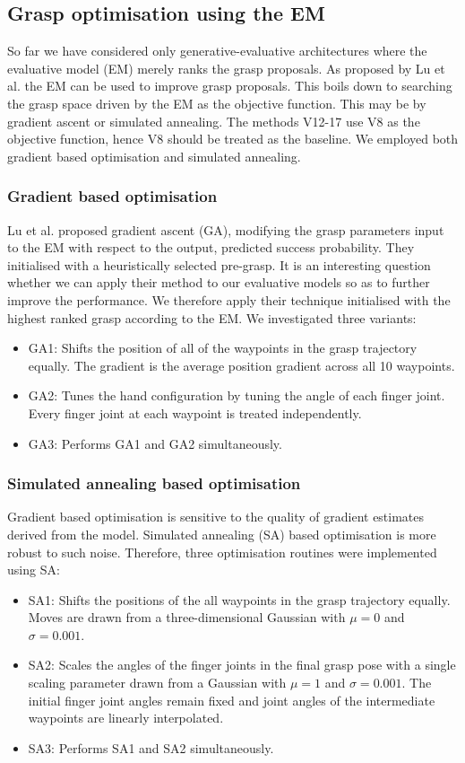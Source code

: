 \subsection{Grasp optimisation using the EM}
\noindent
So far we have considered only generative-evaluative architectures where the evaluative model (EM) merely ranks the grasp proposals. As proposed by Lu et al. \cite{lu2017planning} the EM can be used to improve grasp proposals. This boils down to searching the grasp space driven by the EM as the objective function. This may be by gradient ascent or simulated annealing. The methods V12-17 use V8 as the objective function, hence V8 should be treated as the baseline. We employed both gradient based optimisation and simulated annealing.

\subsubsection{Gradient based optimisation}
\noindent
Lu et al. \cite{lu2017planning} proposed gradient ascent (GA), modifying the grasp parameters input to the EM with respect to the output, predicted success probability. They initialised with a heuristically selected pre-grasp. It is an interesting question whether we can apply their method to our evaluative models so as to further improve the performance. We therefore apply their technique initialised with the highest ranked grasp according to the EM. We investigated three variants:
\begin{itemize}
\item GA1: Shifts the position of all of the waypoints in the grasp trajectory equally. The gradient is the average position gradient across all 10 waypoints.
\item GA2: Tunes the hand configuration by tuning the angle of each finger joint. Every finger joint at each waypoint is treated independently.
\item GA3: Performs GA1 and GA2 simultaneously.
\end{itemize}

\subsubsection{Simulated annealing based optimisation}
\noindent
Gradient based optimisation is sensitive to the quality of gradient estimates derived from the model. Simulated annealing (SA) based optimisation is more robust to such noise. Therefore, three optimisation routines were implemented using SA:
\begin{itemize}
\item SA1: Shifts the positions of the all waypoints in the grasp trajectory equally. Moves are drawn from a three-dimensional Gaussian with $\mu=0$ and $\sigma=0.001$. 
\item SA2: Scales the angles of the finger joints in the final grasp pose with a single scaling parameter drawn from a Gaussian with $\mu=1$ and $\sigma=0.001$. The initial finger joint angles remain fixed and joint angles of the intermediate waypoints are linearly interpolated. 
\item SA3: Performs SA1 and SA2 simultaneously.
\end{itemize}
